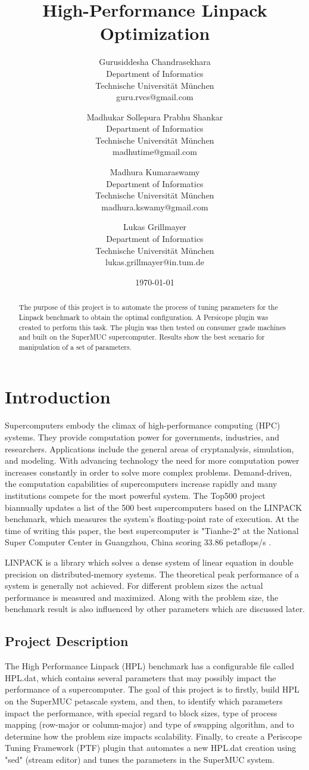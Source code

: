 \documentclass[10pt,twocolumn]{article}
\title{High-Performance Linpack Optimization}
\author{
    Gurusiddesha Chandrasekhara\\
    Department of Informatics\\
    Technische Universit\"at M\"unchen\\
    guru.rvcs@gmail.com
  	\and
    Madhukar Sollepura Prabhu Shankar\\
    Department of Informatics\\
    Technische Universit\"at M\"unchen\\
    madhutime@gmail.com
    \and
    Madhura 	Kumaraswamy\\
    Department of Informatics\\
    Technische Universit\"at M\"unchen\\
    madhura.kswamy@gmail.com
    \and
    Lukas Grillmayer\\
    Department of Informatics\\
    Technische Universit\"at M\"unchen\\
    lukas.grillmayer@in.tum.de
}
\date{\today}
\begin{document}
\maketitle

\begin{abstract}
The purpose of this project is to automate the process of tuning parameters for the Linpack benchmark to obtain the optimal configuration. A Persicope plugin was created to perform this task. The plugin was then tested on consumer grade machines and built on the SuperMUC supercomputer. Results show the best scenario for manipulation of a set of parameters.
\end{abstract}

\section{Introduction}
\label{sec:introduction}
Supercomputers embody the climax of high-performance computing (HPC) systems. They provide computation power for governments, industries, and researchers. Applications include the general areas of cryptanalysis, simulation, and modeling. With advancing technology the need for more computation power increases constantly in order to solve more complex problems. Demand-driven, the computation capabilities of supercomputers increase rapidly and many institutions compete for the most powerful system. The Top500 project biannually updates a list of the 500 best supercomputers based on the LINPACK benchmark, which measures the system's floating-point rate of execution. At the time of writing this paper, the best supercomputer is "Tianhe-2" at the National Super Computer Center in Guangzhou, China scoring 33.86 petaflops/s \cite{top500}.

LINPACK is a library which solves a dense system of linear equation in double precision on distributed-memory systems. The theoretical peak performance of a system is generally not achieved. For different problem sizes the actual performance is measured and maximized. Along with the problem size, the benchmark result is also influenced by other parameters which are discussed later.

\subsection{Project Description}
The High Performance Linpack (HPL) benchmark has a configurable file called HPL.dat, which contains several parameters that may possibly impact the performance of a supercomputer. The goal of this project is to firstly, build HPL on the SuperMUC petascale system, and then, to identify which parameters impact the performance, with special regard to block sizes, type of process mapping (row-major or column-major) and type of swapping algorithm, and to determine how the problem size impacts scalability. Finally, to create a Periscope Tuning Framework (PTF) plugin that automates a new HPL.dat creation using "sed" (stream editor) and tunes the parameters in the SuperMUC system.
\end{document}
